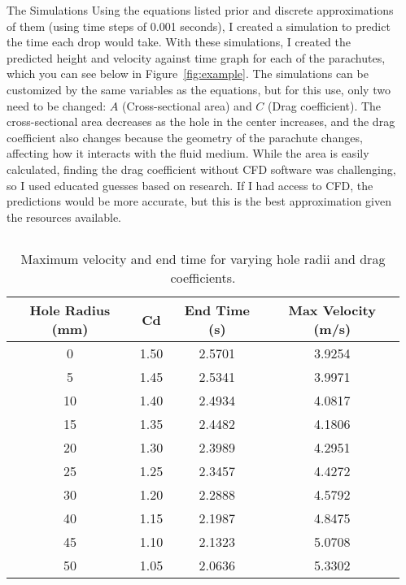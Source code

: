 \documentclass[final]{beamer}
\newlength{\sepwidth}
\newlength{\colwidth}
\newcommand{\separatorcolumn}{\begin{column}{\sepwidth}\end{column}}
\begin{document}
\begin{frame}[t]
\begin{columns}[t]
\separatorcolumn

\begin{column}{\colwidth}

\begin{block}{The Simulations}
Using the equations listed prior and discrete approximations of them (using time steps of 0.001 seconds), I created a simulation to predict the time each drop would take. With these simulations, I created the predicted height and velocity against time graph for each of the parachutes, which you can see below in Figure~\ref{fig:example}. The simulations can be customized by the same variables as the equations, but for this use, only two need to be changed: $A$ (Cross-sectional area) and $C$ (Drag coefficient). The cross-sectional area decreases as the hole in the center increases, and the drag coefficient also changes because the geometry of the parachute changes, affecting how it interacts with the fluid medium. While the area is easily calculated, finding the drag coefficient without CFD software was challenging, so I used educated guesses based on research. If I had access to CFD, the predictions would be more accurate, but this is the best approximation given the resources available.

\begin{columns}

    \begin{column}{0.5\textwidth}  %
        \begin{table}
        \centering
        \begin{tabular}{cccc}
        \toprule
        \textbf{Hole Radius (mm)} & \textbf{Cd} & \textbf{End Time (s)} & \textbf{Max Velocity (m/s)} \\
        \midrule
        0  & 1.50 & 2.5701 & 3.9254 \\
        5  & 1.45 & 2.5341 & 3.9971 \\
        10 & 1.40 & 2.4934 & 4.0817 \\
        15 & 1.35 & 2.4482 & 4.1806 \\
        20 & 1.30 & 2.3989 & 4.2951 \\
        25 & 1.25 & 2.3457 & 4.4272 \\
        30 & 1.20 & 2.2888 & 4.5792 \\
        40 & 1.15 & 2.1987 & 4.8475 \\
        45 & 1.10 & 2.1323 & 5.0708 \\
        50 & 1.05 & 2.0636 & 5.3302 \\
        \bottomrule
        \end{tabular}
        \caption{Maximum velocity and end time for varying hole radii and drag coefficients.}
        \end{table}
    \end{column}


\end{columns}
\end{block}
\end{column}
\end{columns}
\end{frame}
\end{document}
